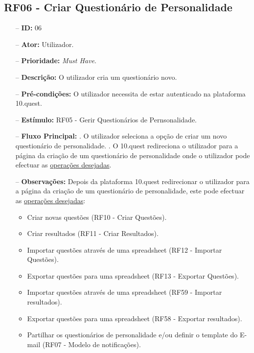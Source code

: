 \subsection{RF06 - Criar Questionário de Personalidade}
\begin{itemize}
	\item[--] \textbf{ID:} 06
	\item[--]  \textbf{Ator:} Utilizador.
	\item[--]  \textbf{Prioridade:} \textit{Must Have}.
	\item[--]  \textbf{Descrição:} O utilizador cria um questionário novo.
	\item[--]  \textbf{Pré-condições:} O utilizador necessita de estar autenticado na plataforma 10.quest.
	\item[--]  \textbf{Estímulo:} RF05 - Gerir Questionários de Pernsonalidade.
	\item[--]  \textbf{Fluxo Principal:} 
		. O utilizador seleciona a opção de criar um novo questionário de personalidade.
		. O 10.quest redireciona o utilizador para a página da criação de um questionário de personalidade onde o utilizador pode efectuar as \underline{operações desejadas}.
	\item[--]  \textbf{Observações:} Depois da plataforma 10.quest redirecionar o utilizador para a página da criação de um questionário de personalidade, este pode efectuar as \underline{operações desejadas}:
	\begin{itemize}
		\item Criar novas questões (RF10 - Criar Questões).
		\item Criar resultados (RF11 - Criar Resultados).
		\item Importar questões através de uma spreadsheet (RF12 - Importar Questões).
		\item Exportar questões para uma spreadsheet (RF13 - Exportar Questões).
		\item Importar questões através de uma spreadsheet (RF59 - Importar resultados).
		\item Exportar questões para uma spreadsheet (RF58 - Exportar resultados).
		\item Partilhar os questionários de personalidade e/ou definir o template do E-mail (RF07 - Modelo de notificações).
	\end{itemize}
\end{itemize}
\newpage

